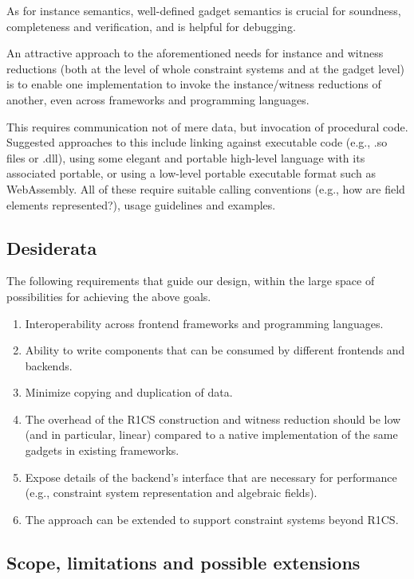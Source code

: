 \documentclass[a4paper,12pt]{article}
\begin{document}
As for instance semantics, well-defined gadget semantics is crucial for soundness, completeness and verification, and is helpful for debugging.

An attractive approach to the aforementioned needs for instance and witness reductions (both at the level of whole constraint systems and at the gadget level) is to enable one implementation to invoke the instance/witness reductions of another, even across frameworks and programming languages.

This requires communication not of mere data, but invocation of procedural code. Suggested approaches to this include linking against executable code (e.g., .so files or .dll), using some elegant and portable high-level language with its associated portable, or using a low-level portable executable format such as WebAssembly. All of these require suitable calling conventions (e.g., how are field elements represented?), usage guidelines and examples.


\subsection{Desiderata}
The following requirements that guide our design, within the large space of possibilities for achieving the above goals.

\begin{enumerate}
	\item Interoperability across frontend frameworks and programming languages.
	\item Ability to write components that can be consumed by different frontends and backends.
	\item Minimize copying and duplication of data.
	\item The overhead of the R1CS construction and witness reduction should be low (and in particular, linear) compared to a native implementation of the same gadgets in existing frameworks.
	\item Expose details of the backend's interface that are necessary for performance (e.g., constraint system representation and algebraic fields).
	\item The approach can be extended to support constraint systems beyond R1CS.
\end{enumerate}

\subsection{Scope, limitations and possible extensions}
\end{document}

